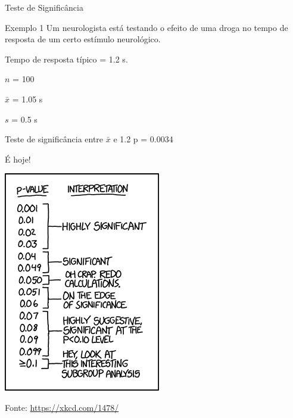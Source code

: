 \documentclass{beamer}
\begin{document}
\begin{frame}{Teste de Significância}
  \begin{exampleblock}{Exemplo 1}
    \scriptsize
    Um neurologista está testando o efeito de uma droga no tempo de
    resposta de um certo estímulo neurológico.

    \smallskip
    Tempo de resposta típico = \alert{1.2 s}.

    \smallskip
    $n$ = \alert{100}

    $\bar{x}$ = \alert{1.05 s}

    $s$ = \alert{0.5 s}

  \end{exampleblock}
  \begin{exampleblock}{Teste de significância entre $\bar{x}$ e 1.2}
      \small
     p = 0.0034
   \end{exampleblock}

   \begin{center}
     \small
     É hoje!
   \end{center}
\end{frame}

\begin{frame}
  \begin{center}
    \includegraphics[height=.9\textheight]{Cap10-11/xkcd-p_values}

    \scriptsize
    \vfill
    \hfill Fonte: \url{https://xkcd.com/1478/}
  \end{center}
\end{frame}
\end{document}
